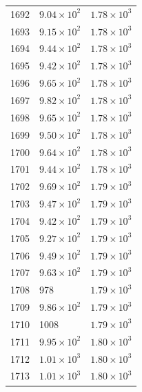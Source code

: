 \begin{table}[H]
\begin{tabular}{lll}
1692 & $\displaystyle 9.04 \times 10^{2}$ & $\displaystyle 1.78 \times 10^{3}$ \\
1693 & $\displaystyle 9.15 \times 10^{2}$ & $\displaystyle 1.78 \times 10^{3}$ \\
1694 & $\displaystyle 9.44 \times 10^{2}$ & $\displaystyle 1.78 \times 10^{3}$ \\
1695 & $\displaystyle 9.42 \times 10^{2}$ & $\displaystyle 1.78 \times 10^{3}$ \\
1696 & $\displaystyle 9.65 \times 10^{2}$ & $\displaystyle 1.78 \times 10^{3}$ \\
1697 & $\displaystyle 9.82 \times 10^{2}$ & $\displaystyle 1.78 \times 10^{3}$ \\
1698 & $\displaystyle 9.65 \times 10^{2}$ & $\displaystyle 1.78 \times 10^{3}$ \\
1699 & $\displaystyle 9.50 \times 10^{2}$ & $\displaystyle 1.78 \times 10^{3}$ \\
1700 & $\displaystyle 9.64 \times 10^{2}$ & $\displaystyle 1.78 \times 10^{3}$ \\
1701 & $\displaystyle 9.44 \times 10^{2}$ & $\displaystyle 1.78 \times 10^{3}$ \\
1702 & $\displaystyle 9.69 \times 10^{2}$ & $\displaystyle 1.79 \times 10^{3}$ \\
1703 & $\displaystyle 9.47 \times 10^{2}$ & $\displaystyle 1.79 \times 10^{3}$ \\
1704 & $\displaystyle 9.42 \times 10^{2}$ & $\displaystyle 1.79 \times 10^{3}$ \\
1705 & $\displaystyle 9.27 \times 10^{2}$ & $\displaystyle 1.79 \times 10^{3}$ \\
1706 & $\displaystyle 9.49 \times 10^{2}$ & $\displaystyle 1.79 \times 10^{3}$ \\
1707 & $\displaystyle 9.63 \times 10^{2}$ & $\displaystyle 1.79 \times 10^{3}$ \\
1708 & 978 & $\displaystyle 1.79 \times 10^{3}$ \\
1709 & $\displaystyle 9.86 \times 10^{2}$ & $\displaystyle 1.79 \times 10^{3}$ \\
1710 & 1008 & $\displaystyle 1.79 \times 10^{3}$ \\
1711 & $\displaystyle 9.95 \times 10^{2}$ & $\displaystyle 1.80 \times 10^{3}$ \\
1712 & $\displaystyle 1.01 \times 10^{3}$ & $\displaystyle 1.80 \times 10^{3}$ \\
1713 & $\displaystyle 1.01 \times 10^{3}$ & $\displaystyle 1.80 \times 10^{3}$ \\

\end{tabular}
\end{table}
